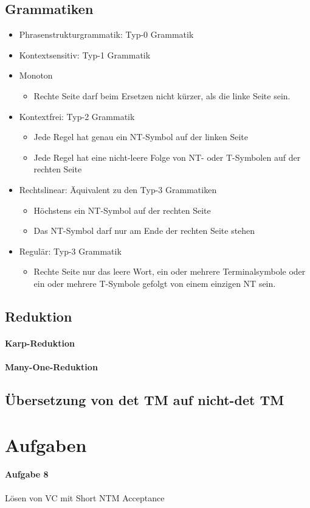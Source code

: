 \documentclass[ngerman]{scrartcl}
\begin{document}
\subsection{Grammatiken}
\begin{itemize}
    \item Phrasenstrukturgrammatik: Typ-0 Grammatik
    \item Kontextsensitiv: Typ-1 Grammatik
    \item Monoton
    \begin{itemize}
        \item Rechte Seite darf beim Ersetzen nicht kürzer, als die linke Seite sein.
    \end{itemize}
    \item Kontextfrei: Typ-2 Grammatik
    \begin{itemize}
        \item Jede Regel hat genau ein NT-Symbol auf der linken Seite
        \item Jede Regel hat eine nicht-leere Folge von NT- oder T-Symbolen auf der rechten Seite
    \end{itemize}
    \item Rechtslinear: Äquivalent zu den Typ-3 Grammatiken 
    \begin{itemize}
        \item Höchstens ein NT-Symbol auf der rechten Seite
        \item Das NT-Symbol darf nur am Ende der rechten Seite stehen
    \end{itemize}
    \item Regulär: Typ-3 Grammatik
    \begin{itemize}
        \item Rechte Seite nur das leere Wort, ein oder mehrere Terminalsymbole oder ein oder mehrere T-Symbole gefolgt von einem einzigen NT sein.
    \end{itemize}
\end{itemize}

\subsection{Reduktion}
\paragraph{Karp-Reduktion}

\paragraph{Many-One-Reduktion}

\subsection{Übersetzung von det TM auf nicht-det TM}

\section{Aufgaben}
\paragraph{Aufgabe 8} Lösen von VC mit Short NTM Acceptance
\end{document}
